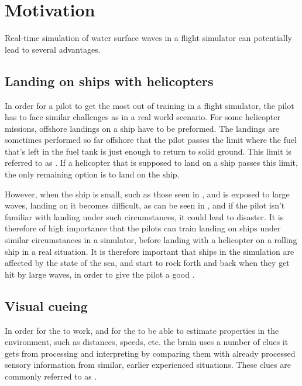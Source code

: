 \chapter{Motivation}

Real-time simulation of water surface waves in a flight simulator can potentially lead to several advantages.

\section{Landing on ships with helicopters}

In order for a pilot to get the most out of training in a flight simulator, the pilot has to face similar challenges as in a real world scenario. For some helicopter missions, offshore landings on a ship have to be preformed. The landings are sometimes performed so far offshore that the pilot passes the limit where the fuel that's left in the fuel tank is just enough to return to solid ground. This limit is referred to as . If a helicopter that is supposed to land on a ship passes this limit, the only remaining option is to land on the ship.

However, when the ship is small, such as those seen in \citep{MrOawal2009,PrismDefence2010,KopulaDK2010}, and is exposed to large waves, landing on it becomes difficult, as can be seen in \citep{PrismDefence2010}, and if the pilot isn't familiar with landing under such circumstances, it could lead to disaster. It is therefore of high importance that the pilots can train landing on ships under similar circumstances in a simulator, before landing with a helicopter on a rolling ship in a real situation. It is therefore important that ships in the simulation are affected by the state of the sea, and start to rock forth and back when they get hit by large waves, in order to give the pilot a good .

\section{Visual cueing}

In order for the  to work, and for the \brain to be able to estimate properties in the environment, such as distances, speeds, etc. the brain uses a number of clues it gets from processing and interpreting  by comparing them with already processed sensory information from similar, earlier experienced situations. These clues are commonly referred to as .

